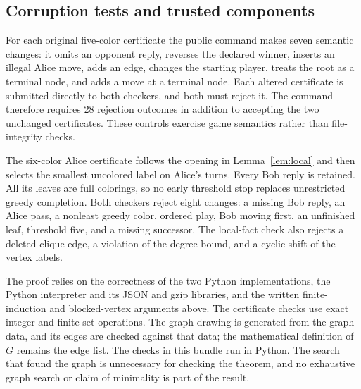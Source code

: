 \documentclass[11pt]{article}
\begin{document}
\subsection{Corruption tests and trusted components}
For each original five-color certificate the public command makes seven semantic changes:
it omits an opponent reply, reverses the declared winner, inserts an
illegal Alice move, adds an edge, changes the starting player, treats
the root as a terminal node, and adds a move at a terminal node.
Each altered certificate is submitted directly to both checkers, and
both must reject it. The command therefore requires $28$ rejection
outcomes in addition to accepting the two unchanged certificates.
These controls exercise game semantics rather than file-integrity checks.

The six-color Alice certificate follows the opening in Lemma~\ref{lem:local}
and then selects the smallest uncolored label on Alice's turns. Every Bob
reply is retained. All its leaves are full colorings, so no early threshold
stop replaces unrestricted greedy completion. Both checkers reject eight
changes: a missing Bob reply, an Alice pass, a nonleast greedy color,
ordered play, Bob moving first, an unfinished leaf, threshold five, and a
missing successor. The local-fact check also rejects a deleted clique edge,
a violation of the degree bound, and a cyclic shift of the vertex labels.

The proof relies on the correctness of the two Python implementations,
the Python interpreter and its JSON and gzip libraries, and the written
finite-induction and blocked-vertex arguments above. The certificate
checks use exact integer and finite-set operations. The graph drawing
is generated from the graph data, and its edges are checked against
that data; the mathematical definition of $G$ remains the edge list.
The checks in this bundle run in Python. The search that found the
graph is unnecessary for checking the theorem, and no exhaustive graph
search or claim of minimality is part of the result.
\end{document}
